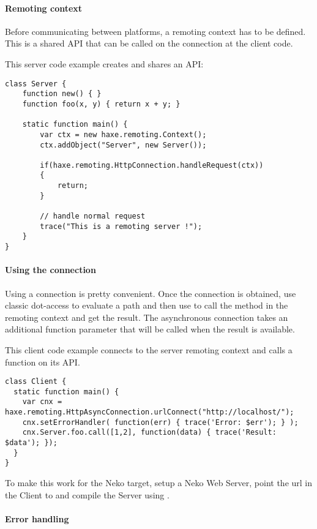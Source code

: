 \paragraph{Remoting context}

Before communicating between platforms, a remoting context has to be defined. This is a shared API that can be called on the connection at the client code.

This server code example creates and shares an API:
\begin{lstlisting}
class Server {
	function new() { }
	function foo(x, y) { return x + y; }

	static function main() {
		var ctx = new haxe.remoting.Context();
		ctx.addObject("Server", new Server());
		
		if(haxe.remoting.HttpConnection.handleRequest(ctx))
		{
			return;
		}
		
		// handle normal request
		trace("This is a remoting server !");
	} 
}
\end{lstlisting}

\paragraph{Using the connection}

Using a connection is pretty convenient. Once the connection is obtained, use classic dot-access to evaluate a path and then use  to call the method in the remoting context and get the result.
The asynchronous connection takes an additional function parameter that will be called when the result is available.

This client code example connects to the server remoting context and calls a function  on its API.
\begin{lstlisting}
class Client {
  static function main() {
    var cnx = haxe.remoting.HttpAsyncConnection.urlConnect("http://localhost/");
    cnx.setErrorHandler( function(err) { trace('Error: $err'); } );
    cnx.Server.foo.call([1,2], function(data) { trace('Result: $data'); });
  }
}
\end{lstlisting}

To make this work for the Neko target, setup a Neko Web Server, point the url in the Client to  and compile the Server using .

\paragraph{Error handling}

